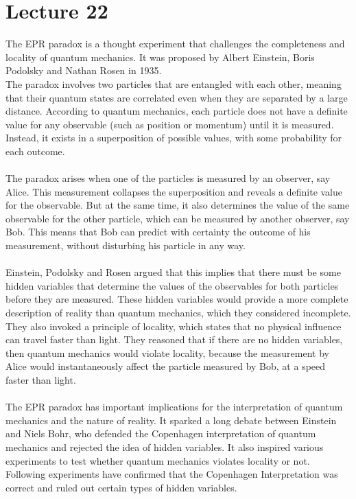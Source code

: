 \documentclass{article}
\begin{document}
\section{Lecture 22}
The EPR paradox is a thought experiment that challenges the completeness and locality of quantum mechanics. It was proposed by Albert Einstein, Boris Podolsky and Nathan Rosen in 1935. \\
The paradox involves two particles that are entangled with each other, meaning that their quantum states are correlated even when they are separated by a large distance. According to quantum mechanics, each particle does not have a definite value for any observable (such as position or momentum) until it is measured. Instead, it exists in a superposition of possible values, with some probability for each outcome.\\ \\
The paradox arises when one of the particles is measured by an observer, say Alice. This measurement collapses the superposition and reveals a definite value for the observable. But at the same time, it also determines the value of the same observable for the other particle, which can be measured by another observer, say Bob. This means that Bob can predict with certainty the outcome of his measurement, without disturbing his particle in any way.\\ \\
Einstein, Podolsky and Rosen argued that this implies that there must be some hidden variables that determine the values of the observables for both particles before they are measured. These hidden variables would provide a more complete description of reality than quantum mechanics, which they considered incomplete. They also invoked a principle of locality, which states that no physical influence can travel faster than light. They reasoned that if there are no hidden variables, then quantum mechanics would violate locality, because the measurement by Alice would instantaneously affect the particle measured by Bob, at a speed faster than light.\\ \\ 
The EPR paradox has important implications for the interpretation of quantum mechanics and the nature of reality. It sparked a long debate between Einstein and Niels Bohr, who defended the Copenhagen interpretation of quantum mechanics and rejected the idea of hidden variables. It also inspired various experiments to test whether quantum mechanics violates locality or not. Following experiments have confirmed that the Copenhagen Interpretation was correct and ruled out certain types of hidden variables. \\ \\ 
\end{document}
